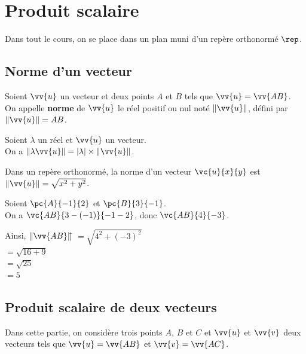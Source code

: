 \documentclass[a4paper,11pt,cours]{nsi} %
\begin{document}
\setcounter{chapter}{9} %



\chapter{Produit scalaire}


Dans tout le cours, on se place dans un plan muni d'un repère orthonormé $\rep$.
\section{Norme d'un vecteur}

\begin{definition}[]
    Soient $\vv{u}$ un vecteur et deux points $A$ et $B$ tels que $\vv{u} = \vv{AB}$.\\
    On appelle \textbf{norme} de $\vv{u}$ le réel positif ou nul noté $\left\|\vv{u}\right\|$, défini par $\left\|\vv{u}\right\| = AB$.
\end{definition}

\begin{propriete}[]
    Soient $\lambda$ un réel et $\vv{u}$ un vecteur.\\
    On a $\left\|\lambda \vv{u}\right\| = \left|\lambda\right| \times \left\|\vv{u}\right\|$.
\end{propriete}

\begin{propriete}[]
    Dans un repère orthonormé, la norme d'un vecteur $\vc{u}{x}{y}$ est $\left\|\vv{u}\right\| = \sqrt{x^2 + y^2}$.
\end{propriete}

\begin{exemple}[]
    Soient $\pc{A}{-1}{2}$ et $\pc{B}{3}{-1}$.\\[.5em]
    On a $\vc{AB}{3-(-1)}{-1-2}$, donc $\vc{AB}{4}{-3}$.
    \begin{tabbing}
         Ainsi, $\left\|\vv{AB}\right\|$\= $= \sqrt{4^2 + (-3)^2}$\\
         \>$ = \sqrt{16 + 9}$\\
         \>$ = \sqrt{25}$\\
         \>$ = 5$
    \end{tabbing}
\end{exemple}
\newpage

\section{Produit scalaire de deux vecteurs}
Dans cette partie, on considère trois points $A$, $B$ et $C$ et $\vv{u}$ et $\vv{v}$ deux vecteurs tels que $\vv{u} = \vv{AB}$ et $\vv{v} = \vv{AC}$.\\
\end{document}
